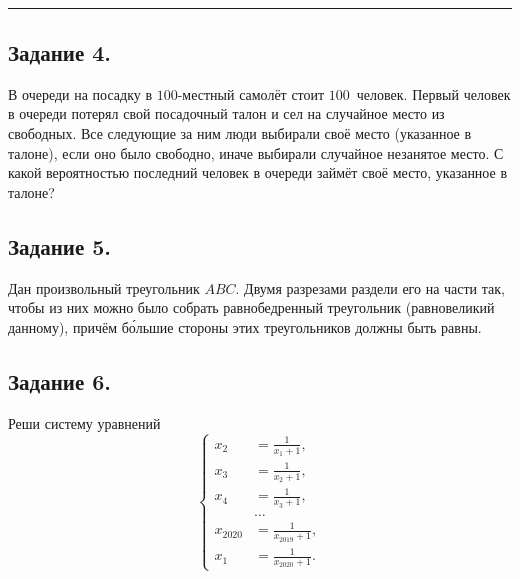 \\
\rule[0.5\baselineskip]{\textwidth}{1pt}

\vspace{0\baselineskip}

\subsection*{Задание 4.}

В очереди на посадку в $100$-местный самолёт стоит $100$~человек. Первый человек в очереди потерял свой посадочный талон и сел на случайное место из свободных. Все следующие за ним люди выбирали своё место (указанное в талоне), если оно было свободно, иначе выбирали случайное незанятое место. С какой вероятностью последний человек в очереди займёт своё место, указанное в талоне?

\subsection*{Задание 5.}

Дан произвольный треугольник $ABC$. Двумя разрезами раздели его на части так, чтобы из них можно было собрать равнобедренный треугольник (равновеликий данному), причём б{\'{о}}льшие стороны этих треугольников должны быть равны.

\subsection*{Задание 6.}

Реши систему уравнений
\begin{equation*}\left\{
\begin{aligned}
    x_2 &= \frac{1}{x_1 + 1},\\
    x_3 &= \frac{1}{x_2 + 1},\\
    x_4 &= \frac{1}{x_3 + 1},\\
    &\ldots\\
    x_{2020} &= \frac{1}{x_{2019} + 1},\\
    x_1 &= \frac{1}{x_{2020} + 1}.
\end{aligned}\right.
\end{equation*}